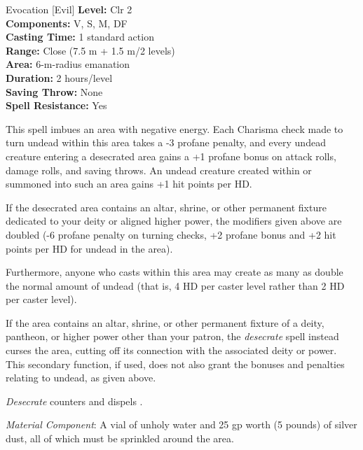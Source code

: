 {Evocation [Evil]}
{
	\textbf{Level:}
	Clr 2\\
	\textbf{Components:}
	V, S, M, DF\\
	\textbf{Casting Time:}
	1 standard action\\
	\textbf{Range:}
	Close (7.5 m + 1.5 m/2 levels)\\
	\textbf{Area:}
	6-m-radius emanation\\
	\textbf{Duration:}
	2 hours/level\\
	\textbf{Saving Throw:}
	None\\
	\textbf{Spell Resistance:}
	Yes\\
}
{
	This spell imbues an area with negative energy. Each Charisma check made to turn undead within this area takes a -3 profane penalty, and every undead creature entering a desecrated area gains a +1 profane bonus on attack rolls, damage rolls, and saving throws. An undead creature created within or summoned into such an area gains +1 hit points per HD.

	If the desecrated area contains an altar, shrine, or other permanent fixture dedicated to your deity or aligned higher power, the modifiers given above are doubled (-6 profane penalty on turning checks, +2 profane bonus and +2 hit points per HD for undead in the area).

	Furthermore, anyone who casts  within this area may create as many as double the normal amount of undead (that is, 4 HD per caster level rather than 2 HD per caster level).

	If the area contains an altar, shrine, or other permanent fixture of a deity, pantheon, or higher power other than your patron, the \emph{desecrate} spell instead curses the area, cutting off its connection with the associated deity or power. This secondary function, if used, does not also grant the bonuses and penalties relating to undead, as given above.

	\emph{Desecrate} counters and dispels .

	\textit{Material Component}:
	A vial of unholy water and 25 gp worth (5 pounds) of silver dust, all of which must be sprinkled around the area.

}

